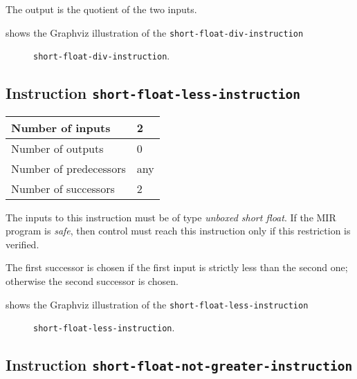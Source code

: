 The output is the quotient of the two inputs.

 shows the Graphviz illustration of the
\texttt{short-float-div-instruction}

\begin{figure}
\begin{center}
\end{center}
\caption{\label{fig-short-float-div-instruction}
\texttt{short-float-div-instruction}.}
\end{figure}

\subsection{Instruction \texttt{short-float-less-instruction}}
\label{mir-instruction-short-float-less}

\begin{tabular}{|l|l|}
\hline
Number of inputs & 2\\
\hline
Number of outputs & 0\\
\hline
Number of predecessors & any\\
\hline
Number of successors & 2\\
\hline
\end{tabular}

The inputs to this instruction must be of type \emph{unboxed short
  float}.  If the MIR program is \emph{safe}, then control must reach
this instruction only if this restriction is verified.

The first successor is chosen if the first input is strictly less than
the second one; otherwise the second successor is chosen. 

 shows the Graphviz illustration of the
\texttt{short-float-less-instruction}

\begin{figure}
\begin{center}
\end{center}
\caption{\label{fig-short-float-less-instruction}
\texttt{short-float-less-instruction}.}
\end{figure}

\subsection{Instruction \texttt{short-float-not-greater-instruction}}
\label{mir-instruction-short-float-not-greater}

